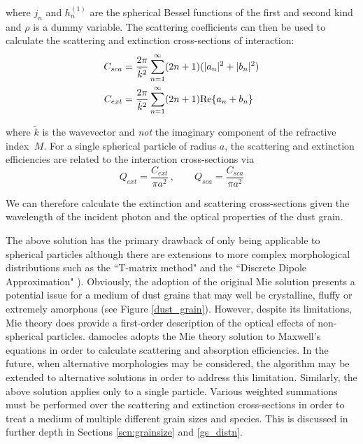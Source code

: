 \noindent where $j_n$ and $h_n^{(1)}$ are the spherical Bessel functions of the first and second kind and $\rho$ is a dummy variable.  The scattering coefficients can then be used to calculate the scattering and extinction cross-sections of interaction:
\begin{align}
C_{sca}&=\frac{2\pi}{\tilde{k}^2}\sum_{n=1}^{\infty} (2n+1)(|a_n|^2+|b_n|^2) \\
C_{ext}&=\frac{2\pi}{\tilde{k}^2}\sum_{n=1}^{\infty} (2n+1)\textnormal{Re}\{a_n+b_n\} 
\end{align}

\noindent where $\tilde{k}$ is the wavevector and {\em not} the imaginary component of the refractive index $~M$.  For a single spherical particle of radius $a$, the scattering and extinction efficiencies are related to the interaction cross-sections via
\begin{equation}
Q_{ext}=\frac{C_{ext}}{\pi a^2}\, , \quad \quad Q_{sca}=\frac{C_{sca}}{\pi a^2}
\end{equation}

\noindent We can therefore calculate the extinction and scattering cross-sections given the wavelength of the incident photon and the optical properties of the dust grain.  



The above solution has the primary drawback of only being applicable to spherical particles although there are extensions to more complex morphological distributions such as the ``T-matrix method" and the ``Discrete Dipole Approximation" \citep{Mishchenko2002,Draine2004}). Obviously, the adoption of the original Mie solution presents a potential issue for a medium of dust grains that may well be crystalline, fluffy or extremely amorphous (see Figure \ref{dust_grain}).  However, despite its limitations, Mie theory does provide a first-order description of the optical effects of non-spherical particles.  {\sc damocles} adopts the Mie theory solution to Maxwell's equations in order to calculate scattering and absorption efficiencies.  In the future, when alternative morphologies may be considered, the algorithm may be extended to alternative solutions  in order to address this limitation.  Similarly, the above solution applies only to a single particle.  Various weighted summations must be performed over the scattering and extinction cross-sections in order to treat a medium of multiple different grain sizes and species.  This is discussed in further depth in Sections \ref{scn:grainsize} and \ref{gs_distn}.

